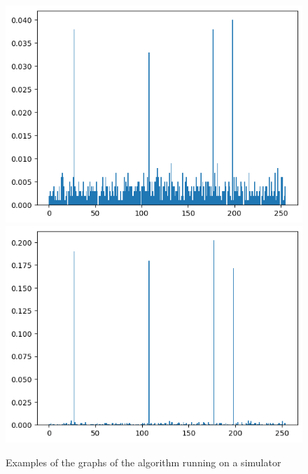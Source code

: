 \documentclass[10pt,a4paper]{article}
\begin{document}
\begin{figure}[hbtp]
\centering
\includegraphics[scale=0.5]{results/example_1_1_iteration.png}
\includegraphics[scale=0.5]{results/example_1_8_iterations.png}
\caption{Examples of the graphs of the algorithm running on a simulator}
\end{figure}
\end{document}
